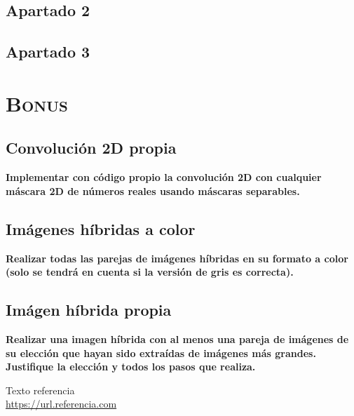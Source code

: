\documentclass[11pt,a4paper]{article}
\begin{document}
\subsection{Apartado 2}

\subsection{Apartado 3}

\newpage

\section{\textsc{Bonus}}

\subsection{Convolución 2D propia}

\noindent \textbf{Implementar con código propio la convolución 2D con cualquier máscara 2D de números reales usando
máscaras separables.}

\subsection{Imágenes híbridas a color}

\noindent \textbf{Realizar todas las parejas de imágenes híbridas en su formato a color (solo se tendrá en cuenta
si la versión de gris es correcta).}

\subsection{Imágen híbrida propia}

\noindent \textbf{Realizar una imagen híbrida con al menos una pareja de imágenes de su elección que hayan
sido extraídas de imágenes más grandes. Justifique la elección y todos los pasos que realiza.}

\newpage

\begin{thebibliography}{5}

Texto referencia
\\\url{https://url.referencia.com}

\end{thebibliography}
\end{document}

